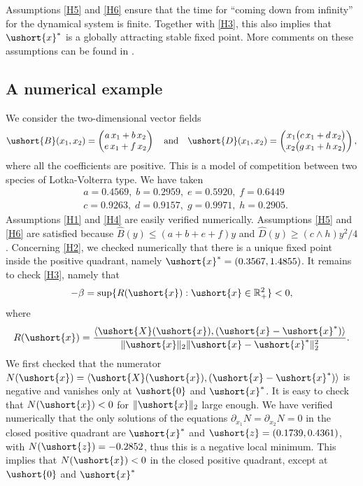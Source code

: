 \documentclass[10pt]{amsart}
\newcommand{\scaleto}[2]{#1}
\numberwithin{equation}{section}
\theoremstyle{plain}
\theoremstyle{definition}
\newcommand{\real}{\mathbb{R}}
\newcommand{\vecxf}{\ushort{x}^*}
\newcommand{\vecx}{\ushort{x}}
\newcommand{\vecz}{\ushort{z}}
\newcommand{\vecX}{\ushort{X}}
\newcommand{\vecB}{\ushort{B}}
\newcommand{\vecD}{\ushort{D}}
\newcommand{\veczer}{\ushort{0}}
\newcommand{\normdeux}[1]{\|#1\|_{2}}\let\snormdeux\normdeux
\begin{document}
Assumptions \eqref{H5} and \eqref{H6} ensure that the time for ``coming down from infinity'' for the
dynamical system is finite. Together with \eqref{H3}, this also implies that $\vecxf$ is a
globally attracting stable fixed point. More comments on these assumptions can be found in
\cite{ccm2}.

\subsection{A numerical example}

We consider the two-dimensional vector fields
\[
\vecB(x_1,x_{2})=
\begin{pmatrix}
a\,x_1+b\,x_{2}\\
e\,x_1+f\,x_{2}
\end{pmatrix}
\quad
\text{and}
\quad
\vecD(x_1,x_{2})=
\begin{pmatrix}
x_1\bigl(c\,x_1+d\,x_{2}\bigr)\\
x_{2}\bigl(g\,x_1+h\,x_{2}\bigr)
\end{pmatrix},
\]
where all the coefficients are positive. This is a model of competition between two species of Lotka-Volterra type.
We have taken
\begin{align*}
& a= 0.4569,\; b= 0.2959,\;e= 0.5920,\;f= 0.6449\\
& c= 0.9263,\;d= 0.9157,\;g= 0.9971,\;h= 0.2905.
\end{align*}
Assumptions \eqref{H1} and \eqref{H4} are easily verified numerically.
Assumptions \eqref{H5} and \eqref{H6} are satisfied because $\widehat{B}(y)\leq (a+b+e+f)y$ and
$\widehat{D}(y)\geq (c\wedge h)y^2/4$.
Concerning \eqref{H2}, we checked numerically that there is a unique fixed point inside the positive quadrant, namely
$\vecxf=(0.3567,1.4855)$.
It remains to check \eqref{H3}, namely that
\[
-\beta= \sup\{R(\vecx):\vecx \in \real_{\scaleto{+}{5pt}}^2\}<0,
\]
where
\[
R(\vecx)=\frac{\langle \vecX(\vecx),(\vecx-\vecxf)\rangle}{\normdeux{\vecx}\normdeux{\vecx-\vecxf}^{2}}.
\]
We first checked that the numerator $N(\vecx)=\langle\vecX(\vecx),(\vecx-\vecxf)\rangle$ is negative and vanishes only at
$\veczer$ and $\vecxf$. It is easy to check that $N(\vecx)<0$ for $\normdeux{\vecx}$ large enough. We have verified
numerically that the only solutions of the equations $\partial_{x_1}N=\partial_{x_2}N=0$ in the closed positive quadrant are
$\vecxf$ and $\vecz=(0.1739, 0.4361)$, with $N(\vecz)= -0.2852$, thus this is a negative local minimum.
This implies that $N(\vecx)<0$ in the closed positive quadrant, except at $\veczer$ and $\vecxf$
\end{document}
